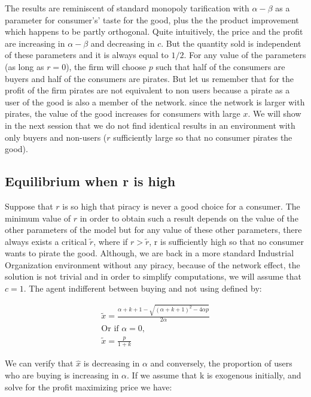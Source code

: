 \documentclass[11pt]{article}
\begin{document}
The results are reminiscent of standard monopoly tarification with $\alpha-\beta$ as a parameter for consumer's' taste for the good, plus the the product improvement which happens to be partly orthogonal. Quite intuitively, the price and the profit are increasing in $\alpha-\beta$ and decreasing in $c$. But the quantity sold is independent of these parameters and it is always equal to $1/2$. For any value of the parameters (as long as $r=0$), the firm will choose $p$ such that half of the consumers are buyers and half of the consumers are pirates. But let us remember that for the profit of the firm pirates are not equivalent to non users because a pirate as a user of the good is also a member of the network. since the network is larger with pirates, the value of the good increases for consumers with large $x$. We will show in the next session  that we do not find identical results in an environment with only buyers and non-users ($r$ sufficiently large so that no consumer pirates the good). 


\subsection{ Equilibrium when r is high}


Suppose that $r$ is so high that piracy is never a good choice for a consumer. The minimum value of $r$ in order to obtain such a result depends on the value of the other parameters of the model but for any value of these other parameters, there always exists a critical $\tilde{r}$, where if $r>\tilde{r}$, r is sufficiently high so that no consumer wants to pirate the good. Although, we are back in a more standard Industrial Organization environment without any piracy, because of the network effect, the solution is not trivial and in order to simplify computations, we will assume that $c = 1$.  The agent indifferent between buying and not using defined by:

\begin{align*}
\tilde{x} = \frac{\alpha+k+1-\sqrt{(\alpha+k+1)^2-4 \alpha p}}{2 \alpha} \\
\text{Or if } \alpha=0, \\
\tilde{x}=\frac{p}{1+k}
\end{align*}

We can verify that $\hat{x}$ is decreasing in $\alpha$ and conversely, the proportion of users who are buying is increasing in $\alpha$. If we assume that k is exogenous initially, and solve for the profit maximizing price we have:
\end{document}
